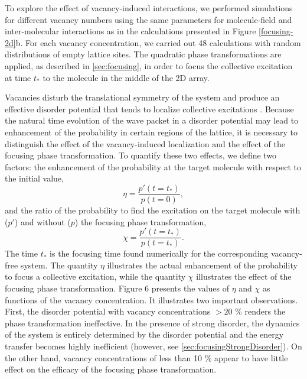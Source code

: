 To explore the effect of vacancy-induced interactions, we performed simulations for
different vacancy numbers using the same parameters for molecule-field and inter-molecular interactions as
in the calculations presented in Figure \ref{focusing-2d}b. For each vacancy concentration, we carried out 48
calculations with random distributions of empty lattice sites. The quadratic phase transformations are applied,
as described in \autoref{sec:focusing}, in order to focus the collective excitation at time $t_{\ast}$ to
the molecule in the middle of the 2D array.

Vacancies disturb the translational symmetry of the system and produce an effective disorder potential that tends to
localize collective excitations \cite{perez-rios2010}.
 Because the natural time evolution of the wave packet in a disorder potential may lead to enhancement of the probability in certain
regions of the lattice, it is necessary to distinguish the effect of the vacancy-induced localization and the effect of the focusing phase
transformation. To quantify these two effects, we define two factors:
the enhancement of the probability at the target molecule with respect to the initial value,
\begin{equation}
\eta = \frac{p' (t=t_{\ast})}{p(t=0)},
\label{eta}
\end{equation}
and the ratio of the probability to find the excitation on the target molecule with ($p'$) and without ($p$) the focusing
phase transformation,
\begin{equation}
\chi = \frac{p' (t=t_{{\ast}})}{p (t=t_{ {\ast}})}.
\end{equation}
The time $t_*$ is the focusing time found numerically for the corresponding vacancy-free system.
 The quantity $\eta$ illustrates the actual enhancement of the probability to focus a collective excitation,
while the quantity $\chi$ illustrates the effect of the focusing phase transformation.
Figure 6 presents the values of $\eta$ and $\chi$ as functions of the vacancy concentration.
It illustrates two important observations. First, the disorder potential with vacancy concentrations $> 20$ \%
renders the phase transformation ineffective. In the presence of strong disorder, the dynamics of the system is entirely
determined by the disorder potential and the energy transfer becomes highly inefficient (however, see \autoref{sec:focusingStrongDisorder}). On the other hand, vacancy
concentrations of less than 10 \% appear to have little effect on the efficacy of the focusing phase transformation.

